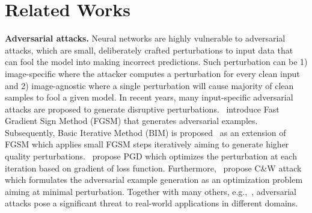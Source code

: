 \section{Related Works}
\label{sec:related}

\textbf{Adversarial attacks.} 
Neural networks are highly vulnerable to adversarial attacks, which are small, deliberately crafted perturbations to input data that can fool the model into making incorrect predictions. Such perturbation can be 1) image-specific where the attacker computes a perturbation for every clean input and 2) image-agnostic where a single perturbation will cause majority of clean samples to fool a given model. In recent years, many input-specific adversarial attacks are proposed to generate disruptive perturbations.~\citet{fgsm} introduce Fast Gradient Sign Method (FGSM) that generates adversarial examples. 
Subsequently, Basic Iterative Method (BIM) is proposed~\citep{BIM} as an extension of FGSM which applies small FGSM steps iteratively aiming to generate higher quality perturbations.~\citet{pgd} propose PGD which optimizes the perturbation at each iteration based on gradient of loss function. 
Furthermore,~\citet{CW} propose C\&W attack which formulates the adversarial example generation as an optimization problem aiming at minimal perturbation. Together with many others, e.g.,~\citep{adv_speech,audio_cnn,deep_face,blackbox_face,fool_topic,fusion}, adversarial attacks pose a significant threat to real-world applications in different domains.

